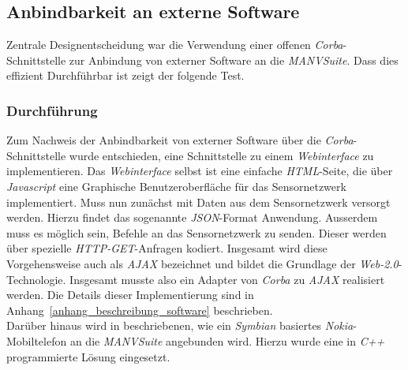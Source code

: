 \subsection{Anbindbarkeit an externe Software}
Zentrale Designentscheidung war die Verwendung einer offenen \emph{Corba}-Schnittstelle zur Anbindung
von externer Software an die \emph{MANVSuite}. Dass dies effizient Durchführbar ist zeigt der folgende
Test.

\subsubsection{Durchführung}
Zum Nachweis der Anbindbarkeit von externer Software über die \emph{Corba}-Schnittstelle wurde entschieden,
eine Schnittstelle zu einem \emph{Webinterface} zu implementieren. Das \emph{Webinterface} selbst ist
eine einfache \emph{HTML}-Seite, die über \emph{Javascript} eine Graphische Benutzeroberfläche für das
Sensornetzwerk implementiert. Muss nun zunächst mit Daten aus dem Sensornetzwerk versorgt werden. Hierzu
findet das sogenannte \emph{JSON}-Format Anwendung. Ausserdem muss es möglich sein, Befehle an das
Sensornetzwerk zu senden. Dieser werden über spezielle \emph{HTTP-GET}-Anfragen kodiert. Insgesamt wird
diese Vorgehensweise auch als \emph{AJAX} bezeichnet und bildet die Grundlage der \emph{Web-2.0}-Technologie.
Insgesamt musste also ein Adapter von \emph{Corba} zu \emph{AJAX} realisiert werden. Die Details dieser
Implementierung sind in Anhang~\ref{anhang_beschreibung_software} beschrieben.\\
Darüber hinaus wird in \cite{Jan} beschriebenen, wie ein \emph{Symbian} basiertes \emph{Nokia}-Mobiltelefon 
an die \emph{MANVSuite} angebunden wird. Hierzu wurde eine in \emph{C++} programmierte Lösung 
eingesetzt.

